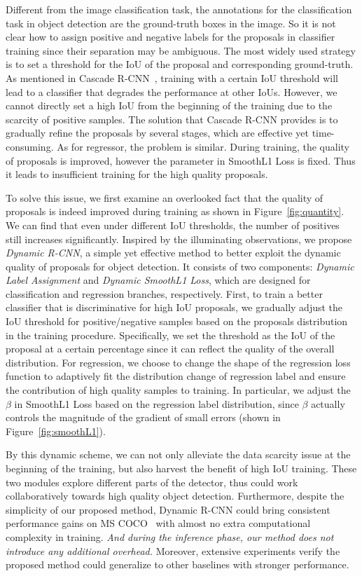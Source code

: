 \documentclass[runningheads]{llncs}
\begin{document}
Different from the image classification task, the annotations for the classification task in object detection are the ground-truth boxes in the image. So it is not clear how to assign positive and negative labels for the proposals in classifier training since their separation may be ambiguous. The most widely used strategy is to set a threshold for the IoU of the proposal and corresponding ground-truth. As mentioned in Cascade R-CNN~\cite{CascadeRCNN}, training with a certain IoU threshold will lead to a classifier that degrades the performance at other IoUs. However, we cannot directly set a high IoU from the beginning of the training due to the scarcity of positive samples. The solution that Cascade R-CNN provides is to gradually refine the proposals by several stages, which are effective yet time-consuming. As for regressor, the problem is similar. During training, the quality of proposals is improved, however the parameter in SmoothL1 Loss is fixed. Thus it leads to insufficient training for the high quality proposals.

To solve this issue, we first examine an overlooked fact that the quality of proposals is indeed improved during training as shown in Figure~\ref{fig:quantity}. We can find that even under different IoU thresholds, the number of positives still increases significantly.
Inspired by the illuminating observations, we propose \textit{Dynamic R-CNN}, a simple yet effective method to better exploit the dynamic quality of proposals for object detection. It consists of two components: \textit{Dynamic Label Assignment} and \textit{Dynamic SmoothL1 Loss}, which are designed for classification and regression branches, respectively.
First, to train a better classifier that is discriminative for high IoU proposals, we gradually adjust the IoU threshold for positive/negative samples based on the proposals distribution in the training procedure. Specifically, we set the threshold as the IoU of the proposal at a certain percentage since it can reflect the quality of the overall distribution.
For regression, we choose to change the shape of the regression loss function to adaptively fit the distribution change of regression label and ensure the contribution of high quality samples to training. In particular, we adjust the $\beta$ in SmoothL1 Loss based on the regression label distribution, since $\beta$ actually controls the magnitude of the gradient of small errors (shown in Figure~\ref{fig:smoothL1}).

By this dynamic scheme, we can not only alleviate the data scarcity issue at the beginning of the training, but also harvest the benefit of high IoU training.
These two modules explore different parts of the detector, thus could work collaboratively towards high quality object detection.
Furthermore, despite the simplicity of our proposed method, Dynamic R-CNN could bring consistent performance gains on MS COCO~\cite{COCO} with almost no extra computational complexity in training. \emph{And during the inference phase, our method does not introduce any additional overhead.}  Moreover, extensive experiments verify the proposed method could generalize to other baselines with stronger performance.
\end{document}
